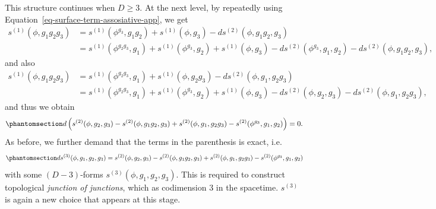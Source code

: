 \documentclass[11pt,toc=bibliography]{scrbook}
\numberwithin{equation}{section}
\begin{document}
This structure continues when \(D\ge 3\). At the next level, by
repeatedly using Equation~\ref{eq-surface-term-assosiative-app}, we get
\[
\begin{split}
s^{(1)}(\phi,g_1g_2g_3) &= s^{(1)}(\phi^{g_3},g_1g_2) + s^{(1)}(\phi,g_3) - ds^{(2)}(\phi,g_1g_2,g_3)\\
&= s^{(1)}(\phi^{g_2g_3},g_1) + s^{(1)}(\phi^{g_3},g_2) + s^{(1)}(\phi,g_3) - ds^{(2)}(\phi^{g_3},g_1,g_2) - ds^{(2)}(\phi,g_1g_2,g_3),
\end{split}
\] and also \[
\begin{split}
s^{(1)}(\phi,g_1g_2g_3) &= s^{(1)}(\phi^{g_2g_3},g_1) + s^{(1)}(\phi,g_2g_3) - ds^{(2)}(\phi,g_1,g_2g_3)\\
&= s^{(1)}(\phi^{g_2g_3},g_1) + s^{(1)}(\phi^{g_3},g_2) + s^{(1)}(\phi,g_3) - ds^{(2)}(\phi,g_2,g_3) - ds^{(2)}(\phi,g_1,g_2g_3),
\end{split}
\] and thus we obtain
\begin{equation}\phantomsection\label{eq-surface-term-pentagon-app}{ 
d\left(s^{(2)}(\phi,g_2,g_3) - s^{(2)}(\phi,g_1g_2,g_3) + s^{(2)}(\phi,g_1,g_2g_3) - s^{(2)}(\phi^{g_3},g_1,g_2)\right)=0.
}\end{equation} As before, we further demand that the terms in the
parenthesis is exact, i.e.~
\begin{equation}\phantomsection\label{eq-surface-term-pentagon-app}{ 
ds^{(3)}(\phi,g_1,g_2,g_3) = s^{(2)}(\phi,g_2,g_3) - s^{(2)}(\phi,g_1g_2,g_3) + s^{(2)}(\phi,g_1,g_2g_3) - s^{(2)}(\phi^{g_3},g_1,g_2)
}\end{equation} with some \((D-3)\)-forms \(s^{(3)}(\phi,g_1,g_2,g_3)\).
This is required to construct topological \emph{junction of junctions},
which as codimension \(3\) in the spacetime. \(s^{(3)}\) is again a new
choice that appears at this stage.
\end{document}
